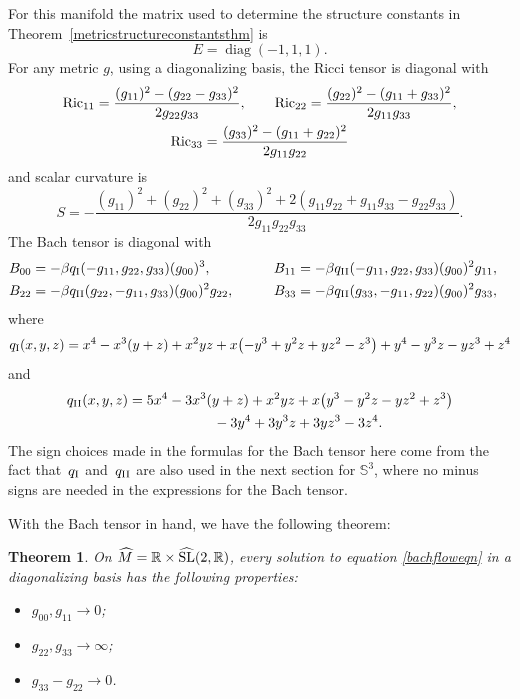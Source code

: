 \documentclass[10pt,a4paper]{amsart}
\numberwithin{equation}{section}
\newtheorem{Theorem}{Theorem}[section]
\newcommand{\diag}{\operatorname{diag}} %
\begin{document}
For this manifold the matrix used to determine the structure constants in Theorem~\ref{metricstructureconstantsthm} is
\[
E = \diag(-1, 1, 1).
\]
For any metric $g$, using a diagonalizing basis, the Ricci tensor is diagonal with
\begin{gather*}
{\rm Ric}_{11} = \frac{(g_{11})^2 - (g_{22} - g_{33})^2}{2 g_{22} g_{33}},\qquad
{\rm Ric}_{22} = \frac{(g_{22})^2 - (g_{11} + g_{33})^2}{2 g_{11} g_{33}},\\
{\rm Ric}_{33} = \frac{(g_{33})^2 - (g_{11} + g_{22})^2}{2 g_{11} g_{22}}
\end{gather*}
and scalar curvature is
\[
S = - \frac{(g_{11})^2 + (g_{22})^2+(g_{33})^2 + 2(g_{11} g_{22} + g_{11} g_{33} - g_{22} g_{33})}
		{2 g_{11} g_{22} g_{33}}.
\]
The Bach tensor is diagonal with
\begin{alignat*}{3}
& B_{00}= -\beta q_{\rm I}(-g_{11}, g_{22}, g_{33}) (g_{00})^3, \qquad &&
B_{11}= -\beta q_{\rm II}(-g_{11}, g_{22}, g_{33}) (g_{00})^2 g_{11},& \\
& B_{22}= -\beta q_{\rm II}(g_{22}, -g_{11}, g_{33}) (g_{00})^2 g_{22},\qquad &&
B_{33}= -\beta q_{\rm II}(g_{33}, -g_{11}, g_{22}) (g_{00})^2 g_{33},&
\end{alignat*}
where
\begin{gather*}
q_{\rm I}(x, y, z) = x^4 - x^3(y + z) + x^2yz
		 + x\big({-}y^3 + y^2z + yz^2 - z^3\big) + y^4 -y^3z -yz^3 + z^4
\end{gather*}
and
\begin{gather*}
q_{\rm II}(x, y, z) = 5x^4 - 3x^3(y + z) + x^2yz
 + x\big(y^3 - y^2z - yz^2 + z^3\big) \\
 \hphantom{q_{\rm II}(x, y, z) =}{} - 3y^4 + 3y^3z + 3yz^3 - 3z^4.
\end{gather*}
The sign choices made in the formulas for the Bach tensor here come from the fact that~$q_{\rm I}$ and~$q_{\rm II}$ are also used in the next section for $\mathbb{S}^3$, where no minus signs are needed in the expressions for the Bach tensor.

With the Bach tensor in hand, we have the following theorem:

\begin{Theorem} \label{sl2rthm}
On $\widehat{M} = \mathbb{R} \times \widehat{{\rm SL}}(2,\mathbb{R})$, every solution to equation \eqref{bachfloweqn} in a diagonalizing basis has the following properties:
\begin{itemize}\itemsep=0pt
\item $g_{00}, g_{11} \rightarrow 0$;
\item $g_{22}, g_{33} \rightarrow \infty$;
\item $g_{33} - g_{22} \rightarrow 0$.
\end{itemize}
\end{Theorem}
\end{document}
